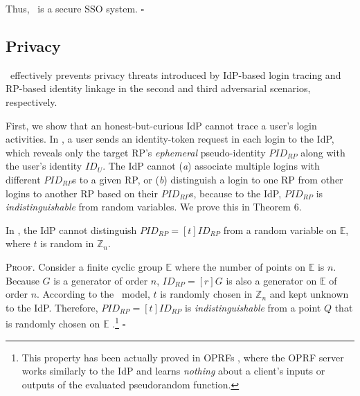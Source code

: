 Thus, \usso\ is a secure SSO system.
\hfill $\square$


\subsection{Privacy}
\label{sec-:analysis}
\usso\ effectively prevents privacy threats introduced by IdP-based login tracing and RP-based identity linkage in the second and third adversarial scenarios, respectively.

\newc
First, we show that an honest-but-curious IdP cannot trace a user's login activities. In \usso, a user sends an identity-token request in each login to the IdP, %
which reveals only the target RP's \emph{ephemeral} pseudo-identity $PID_{RP}$ along with the user's identity $ID_U$.
The IdP cannot (\emph{a}) associate multiple logins with different $PID_{RP}$s to a given RP,
 or (\emph{b}) distinguish a login to one RP from other logins to another RP based on their $PID_{RP}$s,
 because to the IdP, $PID_{RP}$ is \emph{indistinguishable} from random variables. We prove this in Theorem 6.

\vspace{2mm}
 { In \usso, the IdP cannot distinguish $PID_{RP} = [t]ID_{RP}$ from a random variable on $\mathbb{E}$, where $t$ is random in $\mathbb{Z}_n$.} %

\vspace{0.85mm}
\noindent \textsc{Proof.}
Consider a finite cyclic group $\mathbb{E}$ where the number of points on $\mathbb{E}$ is $n$.
Because $G$ is a generator of order $n$, $ID_{RP} = [r]G$ is also a generator on $\mathbb{E}$ of order $n$. According to the \dyu\ model, $t$ is randomly chosen in $\mathbb{Z}_n$ and kept unknown to the IdP. Therefore, $PID_{RP} = [t]ID_{RP}$ is \emph{indistinguishable} from a point $Q$ that is randomly chosen on $\mathbb{E}$ \cite{oprf-proved,voprf-proved}.\footnote{\newc This property has been actually proved in OPRFs \cite{oprf-proved,voprf-proved}, where the OPRF server works similarly to the IdP and learns \emph{nothing} about a client's inputs or outputs of the evaluated pseudorandom function.} \hfill $\square$



